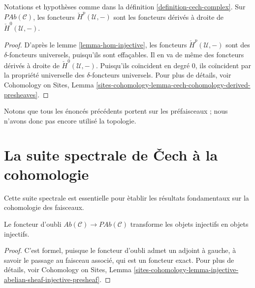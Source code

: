 \begin{theorem}
\label{theorem-cech-derived}
Notations et hypoth\`eses comme dans la d\'efinition \ref{definition-cech-complex}.
Sur $\textit{PAb}(\mathcal{C})$, les foncteurs $\check{H}^p(\mathcal{U}, -)$ sont
les foncteurs d\'eriv\'es \`a droite de $\check{H}^0(\mathcal{U}, -)$.
\end{theorem}

\begin{proof}
D'apr\`es le lemme \ref{lemma-hom-injective}, les foncteurs
$\check H^p(\mathcal{U}, -)$ sont des
$\delta$-foncteurs universels, puisqu'ils sont effa\c{c}ables.
Il en va de m\^eme des foncteurs d\'eriv\'es \`a droite de $\check H^0(\mathcal{U}, -)$. Puisqu'ils
co\"incident en degr\'e $0$, ils co\"incident par la propri\'et\'e universelle des
$\delta$-foncteurs universels. Pour plus de d\'etails, voir
Cohomology on Sites,
Lemma \ref{sites-cohomology-lemma-cech-cohomology-derived-presheaves}.
\end{proof}

\begin{remark}
\label{remark-presheaves-no-topology}
Notons que tous les \'enonc\'es pr\'ec\'edents portent sur les pr\'efaisceaux ; nous n'avons donc
pas encore utilis\'e la topologie.
\end{remark}




\section{La suite spectrale de {\v C}ech \`a la cohomologie}
\label{section-cech-ss}

\noindent
Cette suite spectrale est essentielle pour \`etablir les r\'esultats fondamentaux sur la
cohomologie des faisceaux.

\begin{lemma}
\label{lemma-forget-injectives}
Le foncteur d'oubli $\textit{Ab}(\mathcal{C})\to \textit{PAb}(\mathcal{C})$
transforme les objets injectifs en objets injectifs.
\end{lemma}

\begin{proof}
C'est formel, puisque le foncteur d'oubli admet un adjoint \`a gauche,
\`a savoir le passage au faisceau associ\'e, qui est un foncteur exact. Pour plus de d\'etails, voir
Cohomology on Sites,
Lemma \ref{sites-cohomology-lemma-injective-abelian-sheaf-injective-presheaf}.
\end{proof}

